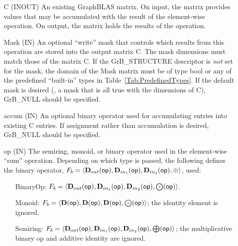 \begin{itemize}[leftmargin=1.1in]
    \item[{\sf C}]    ({\sf INOUT}) An existing GraphBLAS matrix. On input,
    the matrix provides values that may be accumulated with the result of the
    element-wise operation.  On output, the matrix holds the results of the
    operation.

    \item[{\sf Mask}] ({\sf IN}) An optional ``write'' mask that controls which
    results from this operation are stored into the output matrix {\sf C}. The 
    mask dimensions must match those of the matrix {\sf C}. If the 
    {\sf GrB\_STRUCTURE} descriptor is {\em not} set for the mask, the domain of the 
    {\sf Mask} matrix must be of type {\sf bool} or any of the predefined 
    ``built-in'' types in Table~\ref{Tab:PredefinedTypes}.  If the default
    mask is desired (\ie, a mask that is all {\sf true} with the dimensions of {\sf C}), 
    {\sf GrB\_NULL} should be specified.

    \item[{\sf accum}] ({\sf IN}) An optional binary operator used for accumulating
    entries into existing {\sf C} entries.
    If assignment rather than accumulation is
    desired, {\sf GrB\_NULL} should be specified.

    \item[{\sf op}]   ({\sf IN}) The semiring, monoid, or binary operator 
    used in the element-wise ``sum'' operation.  Depending on which type is
    passed, the following defines the binary operator, 
    $F_b=\langle \mbox{$\mathbf{D}_{out}$}({\sf op}),\mbox{$\mathbf{D}_{in_{1}}$}({\sf op}),\mbox{$\mathbf{D}_{in_{2}}$}({\sf op}),\oplus\rangle$, used:
    \begin{itemize}[leftmargin=1.1in]
    \item[BinaryOp:] $F_b = \langle \mbox{$\mathbf{D}_{out}$}({\sf op}), \mbox{$\mathbf{D}_{in_{1}}$}({\sf op}),
    \mbox{$\mathbf{D}_{in_{2}}$}({\sf op}),\bold{\bigodot}({\sf op})\rangle$.  
    \item[Monoid:] $F_b = \langle \bold{D}({\sf op}), \bold{D}({\sf op}),
    \bold{D}({\sf op}),\bold{\bigodot}({\sf op})\rangle$;
    the identity element is ignored. 
    \item[Semiring:] $F_b = \langle \mbox{$\mathbf{D}_{out}$}({\sf op}), \mbox{$\mathbf{D}_{in_{1}}$}({\sf op}),
    \mbox{$\mathbf{D}_{in_{2}}$}({\sf op}),\bold{\bigoplus}({\sf op})\rangle$; the
    multiplicative binary op and additive identity are ignored.
    \end{itemize}
    

\end{itemize}
